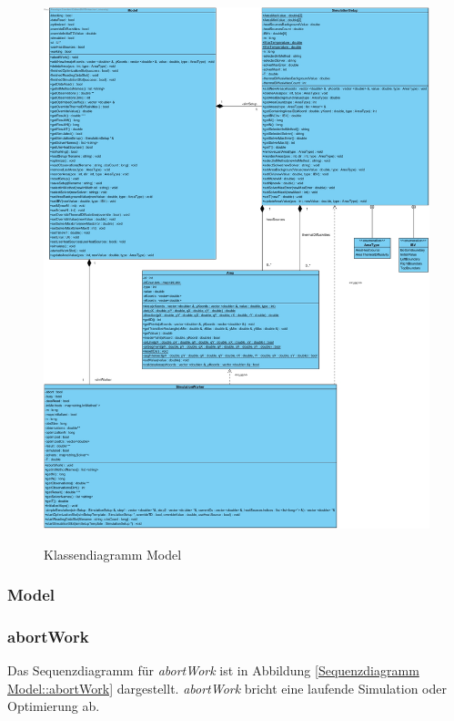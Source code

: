 \begin{figure}[H]
	\centering
	\includegraphics[scale=.38]{Bilder/model.jpg}\\
	\caption{Klassendiagramm Model}
	\label{Klassendiagramm Model}
\end{figure}

\subsubsection{Model}

\subsubsection*{abortWork}

Das Sequenzdiagramm für \emph{abortWork} ist in Abbildung \ref{Sequenzdiagramm Model::abortWork} dargestellt. \emph{abortWork} bricht eine laufende Simulation oder Optimierung ab.

